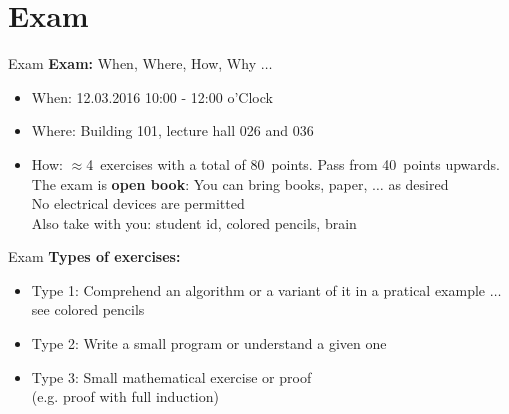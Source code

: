 \section{Exam}

\begin{frame}{Exam}
  \textbf{Exam:} When, Where, How, Why $\ldots$
  \vspace{1em}
  \begin{itemize}
    \item
      When: {\color{Mittel-Gruen}12.03.2016 10:00 - 12:00 o'Clock}
    \item
      Where: {\color{Mittel-Gruen}Building 101, lecture hall 026 and 036}
    \item
      How:
      $\approx$4~exercises with a total of 80~points. Pass from 40~points
      upwards.\\
      The exam is \textbf{open book}: You can bring books, paper, $\ldots$
      as desired\\
      No electrical devices are permitted\\
      Also take with you: {\color{Mittel-Gruen}student id},
      {\color{Mittel-Gruen}colored pencils}, {\color{Mittel-Gruen}brain}
  \end{itemize}
\end{frame}


\begin{frame}{Exam}
  \textbf{Types of exercises:}
  \begin{itemize}
    \item
      Type 1: Comprehend an algorithm or a variant of it in a pratical example
      $\ldots$ see {\color{Mittel-Gruen}colored pencils}
    \item
      Type 2: Write a small program or understand a given one
    \item
      Type 3: Small mathematical exercise or proof\\
      (e.g. proof with full induction)
  \end{itemize}
\end{frame}